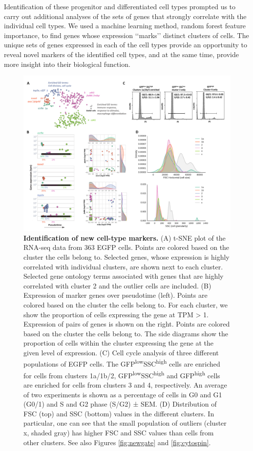 Identification of these progenitor and differentiated cell types prompted us to carry out additional analyses of the sets of genes that strongly correlate with the individual cell types. We used a machine learning method, random forest feature importance, to find genes whose expression ‘‘marks’’ distinct clusters of cells. The unique sets of genes expressed in each of the cell types provide an opportunity to reveal novel markers of the identified cell types, and at the same time, provide more insight into their biological function.

\begin{figure}
    \centering
    \includegraphics[width=\textwidth]{"Figure4"}
    \caption[Identification of new cell-type markers]{\textbf{Identification of new cell-type markers.} (A) t-SNE plot of the RNA-seq data from 363 EGFP cells. Points are colored based on the cluster the cells belong to. Selected genes, whose expression is highly correlated with individual clusters, are shown next to each cluster. Selected gene ontology terms associated with genes that are highly correlated with cluster 2 and the outlier cells are included. (B) Expression of marker genes over pseudotime (left). Points are colored based on the cluster the cells belong to. For each cluster, we show the proportion of cells expressing the gene at TPM > 1. Expression of pairs of genes is shown on the right. Points are colored based on the cluster the cells belong to. The side diagrams show the proportion of cells within the cluster expressing the gene at the given level of expression. (C) Cell cycle analysis of three different populations of EGFP cells. The GFP\textsuperscript{low}SSC\textsuperscript{high} cells are enriched for cells from clusters 1a/1b/2, GFP\textsuperscript{low}SSC\textsuperscript{high} and GFP\textsuperscript{high} cells are enriched for cells from clusters 3 and 4, respectively. An average of two experiments is shown as a percentage of cells in G0 and G1 (G0/1) and S and G2 phase (S/G2) ± SEM. (D) Distribution of FSC (top) and SSC (bottom) values in the different clusters. In particular, one can see that the small population of outliers (cluster x, shaded gray) has higher FSC and SSC values than cells from other clusters. See also Figures \ref{fig:newgate} and \ref{fig:cytospin}.}
    \label{fig:clusters}
\end{figure}

